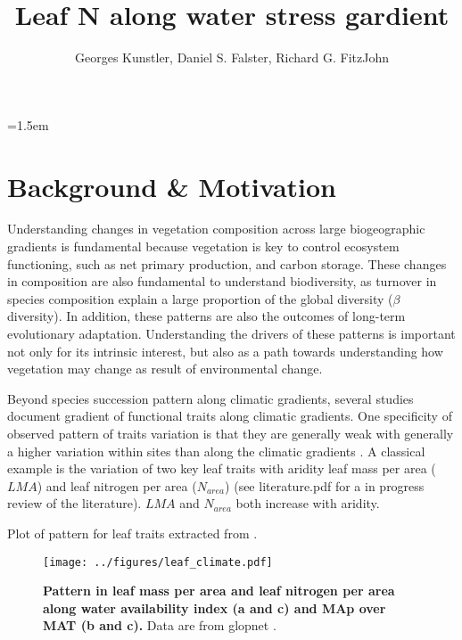 \documentclass[a4paper,11pt]{article}
\title{Leaf N along water stress gardient}
\author{Georges Kunstler, Daniel S. Falster, Richard G. FitzJohn}
\date{}
\affiliation{Irstea Grenoble France}
\affiliation{Department of Biological Sciences, Macquarie University,
  Sydney, Australia}
\begin{document}
\mstitleshort
\parindent=1.5em
\addtolength{\parskip}{.3em}


\section{Background \& Motivation}

Understanding changes in vegetation composition across large biogeographic gradients is fundamental because vegetation is key to control ecosystem functioning, such as net primary production, and carbon storage. These changes in composition are also fundamental to understand biodiversity, as turnover in species composition explain a large proportion of the global diversity ($\beta$ diversity). In addition, these patterns are also the outcomes of long-term evolutionary adaptation. Understanding the drivers of these patterns is important not only for its intrinsic interest, but also as a path towards understanding how vegetation may change as result of environmental change.

Beyond species succession pattern along climatic gradients, several studies document gradient of functional traits along climatic gradients. One specificity of observed pattern of traits variation is that they are generally weak with generally a higher variation within sites than along the climatic gradients \citep[see][]{Wright-2004}. A classical example is the variation of two key leaf traits with aridity leaf mass per area ($LMA$) and leaf nitrogen per area ($N_{area}$) (see literature.pdf for a in progress review of the literature). $LMA$ \citep{Wright-2004,Onoda-2011,Moles-2014} and $N_{area}$ \citep{Wright-2005,Maire-2015} both increase with aridity. 

\clearpage


Plot of pattern for leaf traits extracted from \citep{Wright-2004}.

\begin{figure}[ht]
\centering
\texttt{[image: ../figures/leaf\_climate.pdf]}
\caption{\textbf{Pattern in leaf mass per area and leaf nitrogen per area along water availability index (a and c) and MAp over MAT (b and c).} Data are from glopnet \citep{Wright-2004}.
\label{fig:leafpattern}}
\end{figure}

\clearpage
\end{document}
